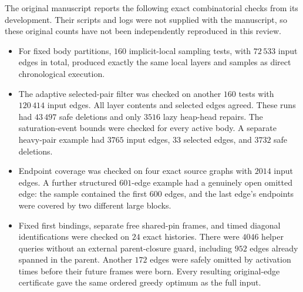 \documentclass[11pt,a4paper]{article}
\theoremstyle{definition}
\theoremstyle{remark}
\begin{document}
The original manuscript reports the following exact combinatorial
checks from its development. Their scripts and logs were not supplied
with the manuscript, so these original counts have not been
independently reproduced in this review.
\begin{itemize}
 \item For fixed body partitions, $160$ implicit-local
 sampling tests, with $72\,533$ input edges in total,
 produced exactly the same local layers and samples
 as direct chronological execution.
 \item The adaptive selected-pair filter was checked
 on another $160$ tests with $120\,414$ input edges.
 All layer contents and selected edges agreed.
 These runs had $43\,497$ safe deletions and only
 $3516$ lazy heap-head repairs. The saturation-event
 bounds were checked for every active body.
 A separate heavy-pair example had $3765$ input
 edges, $33$ selected edges, and $3732$ safe deletions.
 \item Endpoint coverage was checked on four exact
 source graphs with $2014$ input edges.
 A further structured $601$-edge example had a
 genuinely open omitted edge: the sample contained
 the first $600$ edges, and the last edge's endpoints
 were covered by two different large blocks.
 \item Fixed first bindings, separate free shared-pin
 frames, and timed diagonal identifications were
 checked on $24$ exact histories.
 There were $4046$ helper queries without an external
 parent-closure guard, including $952$ edges already
 spanned in the parent. Another $172$ edges were
 safely omitted by activation times before their
 future frames were born.
 Every resulting original-edge certificate gave
 the same ordered greedy optimum as the full input.
\end{itemize}
\end{document}

